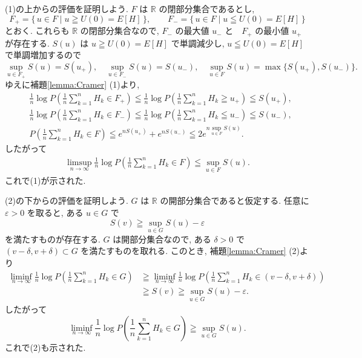 \documentclass[12pt,twoside]{jarticle}
\makeatletter
\newcommand\R{{\mathbb R}} %
\newcommand\eps{\varepsilon}
\theoremstyle{jplain}
\theoremstyle{jplain}
\theoremstyle{jplain}
\numberwithin{theorem}{section}
\numberwithin{equation}{section}
\numberwithin{figure}{section}
\numberwithin{table}{section}
\newcommand\theoremref[1]{定理\ref{#1}}
\newcommand\lemmaref[1]{補題\ref{#1}}
\renewenvironment{proof}[1][\proofname]{\par
  \normalfont
  \topsep6\p@\@plus6\p@ \trivlist
  \item[\hskip\labelsep{\bfseries #1}\@addpunct{\bfseries.}]\ignorespaces
}{%
  \endtrivlist
}
\renewcommand{\proofname}{証明}
\makeatother
\begin{document}
\begin{proof}[\theoremref{theorem:Cramer}の証明]
(1)の上からの評価を証明しよう.
$F$ は $\R$ の閉部分集合であるとし,
\[
F_+=\{\,u\in F\mid u\geqq U(0)=E[H]\,\}, \qquad
F_-=\{\,u\in F\mid u\leqq U(0)=E[H]\,\}
\]
とおく. これらも $\R$ の閉部分集合なので, 
$F_-$ の最大値 $u_-$ と　$F_+$ の最小値 $u_+$ が存在する.
$S(u)$ は $u\geqq U(0)=E[H]$ で単調減少し,
$u\leqq U(0)=E[H]$ で単調増加するので
\[
\sup_{u\in F_+}S(u) = S(u_+), \quad
\sup_{u\in F_-}S(u) = S(u_-), \quad
\sup_{u\in F}S(u) = \max\{S(u_+),S(u_-)\}.
\]
ゆえに\lemmaref{lemma:Cramer} (1)より,
\begin{align*}
&
\frac{1}{n}\log
P\left(\frac{1}{n}\sum_{k=1}^n H_k\in F_+\right)
\leqq
\frac{1}{n}\log
P\left(\frac{1}{n}\sum_{k=1}^n H_k\geqq u_+\right)
\leqq
S(u_+),
\\ &
\frac{1}{n}\log
P\left(\frac{1}{n}\sum_{k=1}^n H_k\in F_-\right)
\leqq
\frac{1}{n}\log
P\left(\frac{1}{n}\sum_{k=1}^n H_k\leqq u_-\right)
\leqq
S(u_-),
\\ &
P\left(\frac{1}{n}\sum_{k=1}^n H_k\in F\right)
\leqq e^{n S(u_+)}+e^{n S(u_-)}
\leqq 2e^{n \sup_{u\in F}S(u)}.
\end{align*}
したがって
\begin{align*}
\limsup_{n\to\infty}
\frac{1}{n}\log
P\left(\frac{1}{n}\sum_{k=1}^n H_k\in F\right)
\leqq \sup_{u\in F}S(u).
\end{align*}
これで(1)が示された.

(2)の下からの評価を証明しよう.
$G$ は $\R$ の開部分集合であると仮定する. 
任意に $\eps>0$ を取ると, ある $u\in G$ で
\[
S(v)\geqq \sup_{u\in G}S(u)-\eps
\]
を満たすものが存在する. 
$G$ は開部分集合なので, ある $\delta>0$ 
で $(v-\delta,v+\delta)\subset G$ を満たすものを取れる.
このとき, \lemmaref{lemma:Cramer} (2)より
\begin{align*}
\liminf_{n\to\infty}
\frac{1}{n}\log
P\left(\frac{1}{n}\sum_{k=1}^n H_k\in G\right)
&
\geqq
\liminf_{n\to\infty}
\frac{1}{n}\log
P\left(\frac{1}{n}\sum_{k=1}^n H_k\in (v-\delta,v+\delta)\right)
\\ &
\geqq S(v)
\geqq \sup_{u\in G} S(u)-\eps.
\end{align*}
したがって
\[
\liminf_{n\to\infty}
\frac{1}{n}\log
P\left(\frac{1}{n}\sum_{k=1}^n H_k\in G\right)
\geqq
\sup_{u\in G} S(u).
\]
これで(2)も示された.


\end{proof}
\end{document}
